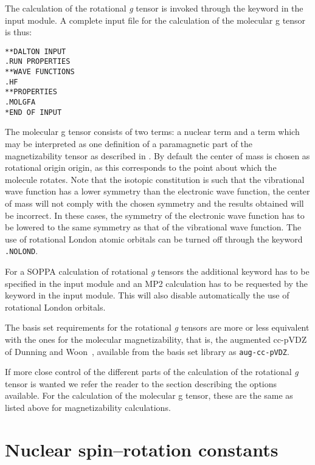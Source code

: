 The calculation of the rotational  {\em g} tensor is invoked through the
keyword  in the  input module. A complete
input file for the calculation of the molecular g tensor is thus:

\begin{verbatim}
**DALTON INPUT
.RUN PROPERTIES
**WAVE FUNCTIONS
.HF
**PROPERTIES
.MOLGFA
*END OF INPUT
\end{verbatim}

The molecular g tensor consists of two terms: a nuclear term and a
term which may be interpreted as one definition of a paramagnetic part
of the magnetizability tensor as
described in \cite{jgkrthjcp105}.
By default the center of mass is chosen as
rotational origin
origin, as this corresponds to the point about which the molecule
rotates. Note that the isotopic constitution is such that the
vibrational wave function has a lower symmetry than the electronic
wave function, the center of mass will not comply with the chosen
symmetry and the results obtained will be incorrect. In these cases,
the symmetry of the electronic wave function has to be lowered to the
same symmetry as that of the vibrational wave function. The use of
rotational London atomic 
orbitals can be turned off through
the keyword \verb|.NOLOND|.

For a SOPPA calculation of rotational  {\em g} tensors the 
additional 
keyword  has to be specified in the  input module 
and an MP2 calculation has to be requested by the keyword  in the 
 input module. This will also disable automatically
the use of rotational London orbitals.
 
The basis set requirements for the rotational {\em g} tensors are more or
less equivalent with the ones for the molecular magnetizability,
that is, the augmented cc-pVDZ of Dunning and
Woon~\cite{thdjcp90,dewthdjcp98}, available from the basis set library
as \verb|aug-cc-pVDZ|.

If more close control of the different parts of the calculation of the
rotational {\em g}  tensor is wanted we refer the reader to the section
describing the options available. For the calculation of the molecular
g tensor, these are the same as listed above for magnetizability
calculations.

\section{Nuclear spin--rotation constants}\label{sec:spinrotasjon}

